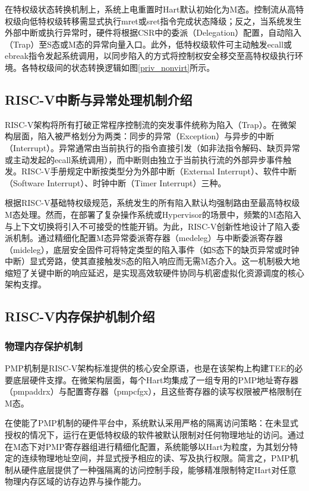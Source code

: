 \documentclass[master, vlined, review]{DissertUESTC}
\begin{document}
	在特权级状态转换机制上，系统上电重置时Hart默认初始化为M态。控制流从高特权级向低特权级转移需显式执行mret或sret指令完成状态降级；反之，当系统发生外部中断或执行异常时，硬件将根据CSR中的委派（Delegation）配置，自动陷入（Trap）至S态或M态的异常向量入口。此外，低特权级软件可主动触发ecall或ebreak指令发起系统调用，以同步陷入的方式将控制权安全移交至高特权级执行环境。各特权级间的状态转换逻辑如图\ref{priv_nonvirt}所示。

	\subsection{RISC-V中断与异常处理机制介绍}
	RISC-V架构将所有打破正常程序控制流的突发事件统称为陷入（Trap）。在微架构层面，陷入被严格划分为两类：同步的异常（Exception）与异步的中断（Interrupt）。异常通常由当前执行的指令直接引发（如非法指令解码、缺页异常或主动发起的ecall系统调用），而中断则由独立于当前执行流的外部异步事件触发。RISC-V手册规定中断按类型分为外部中断（External Interrupt）、软件中断（Software Interrupt）、时钟中断（Timer Interrupt）三种。
	
	根据RISC-V基础特权级规范，系统发生的所有陷入默认均强制路由至最高特权级M态处理。然而，在部署了复杂操作系统或Hypervisor的场景中，频繁的M态陷入与上下文切换将引入不可接受的性能开销。为此，RISC-V创新性地设计了陷入委派机制。通过精细化配置M态异常委派寄存器（medeleg）与中断委派寄存器（mideleg），底层安全固件可将特定类型的陷入事件（如S态下的缺页异常或时钟中断）显式旁路，使其直接触发S态的陷入响应而无需M态介入。这一机制极大地缩短了关键中断的响应延迟，是实现高效软硬件协同与机密虚拟化资源调度的核心架构支撑。
	
	
	\subsection{RISC-V内存保护机制介绍}
	\subsubsection{物理内存保护机制}
	PMP机制是RISC-V架构标准提供的核心安全原语，也是在该架构上构建TEE的必要底层硬件支撑。在微架构层面，每个Hart均集成了一组专用的PMP地址寄存器（pmpaddrx）与配置寄存器（pmpcfgx），且这些寄存器的读写权限被严格限制在M态。
	
	在使能了PMP机制的硬件平台中，系统默认采用严格的隔离访问策略：在未显式授权的情况下，运行在更低特权级的软件被默认限制对任何物理地址的访问。通过在M态下对PMP寄存器组进行精细化配置，系统能够以Hart为粒度，为其划分特定的连续物理地址空间，并显式授予相应的读、写及执行权限。简言之，PMP机制从硬件底层提供了一种强隔离的访问控制手段，能够精准限制特定Hart对任意物理内存区域的访存边界与操作能力。
	
\end{document}
